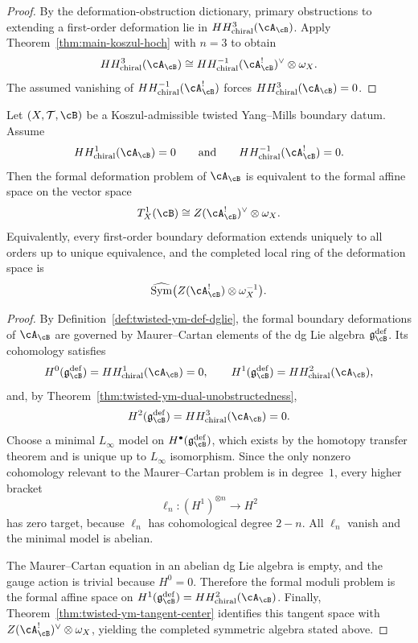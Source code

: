 \begin{proof}
By the deformation-obstruction dictionary, primary obstructions to extending a first-order deformation lie in $HH^{3}_{\mathrm{chiral}}(\cA_{\cB})$. Apply Theorem~\ref{thm:main-koszul-hoch} with $n=3$ to obtain
\[
HH^{3}_{\mathrm{chiral}}(\cA_{\cB})
\cong
HH^{-1}_{\mathrm{chiral}}(\cA_{\cB}^{!})^{\vee}\otimes \omega_X.
\]
The assumed vanishing of $HH^{-1}_{\mathrm{chiral}}(\cA_{\cB}^{!})$ forces $HH^{3}_{\mathrm{chiral}}(\cA_{\cB})=0$.
\end{proof}

\begin{theorem}
\label{thm:twisted-ym-central-formality}
Let $(X,\mathcal{T},\cB)$ be a Koszul-admissible twisted Yang--Mills boundary datum. Assume
\[
HH^{1}_{\mathrm{chiral}}(\cA_{\cB}) = 0
\qquad\text{and}\qquad
HH^{-1}_{\mathrm{chiral}}(\cA_{\cB}^{!}) = 0.
\]
Then the formal deformation problem of $\cA_{\cB}$ is equivalent to the formal affine space on the vector space
\[
T^1_X(\cB)
\cong
Z(\cA_{\cB}^{!})^{\vee}\otimes \omega_X.
\]
Equivalently, every first-order boundary deformation extends uniquely to all orders up to unique equivalence, and the completed local ring of the deformation space is
\[
\widehat{\mathrm{Sym}}\bigl(Z(\cA_{\cB}^{!})\otimes \omega_X^{-1}\bigr).
\]
\end{theorem}

\begin{proof}
By Definition~\ref{def:twisted-ym-def-dglie}, the formal boundary
deformations of $\cA_{\cB}$ are governed by Maurer--Cartan elements of
the dg Lie algebra $\mathfrak{g}^{\mathrm{def}}_{\cB}$. Its cohomology
satisfies
\[
H^0(\mathfrak{g}^{\mathrm{def}}_{\cB}) = HH^{1}_{\mathrm{chiral}}(\cA_{\cB}) = 0,
\qquad
H^1(\mathfrak{g}^{\mathrm{def}}_{\cB}) = HH^{2}_{\mathrm{chiral}}(\cA_{\cB}),
\]
and, by Theorem~\ref{thm:twisted-ym-dual-unobstructedness},
\[
H^2(\mathfrak{g}^{\mathrm{def}}_{\cB}) = HH^{3}_{\mathrm{chiral}}(\cA_{\cB}) = 0.
\]
Choose a minimal $L_\infty$ model on $H^\bullet(\mathfrak{g}^{\mathrm{def}}_{\cB})$, which exists by the homotopy transfer theorem and is unique up to $L_\infty$ isomorphism. Since the only nonzero cohomology relevant to the Maurer--Cartan problem is in degree~$1$, every higher bracket
\[
\ell_n \colon (H^1)^{\otimes n} \longrightarrow H^{2}
\]
has zero target, because $\ell_n$ has cohomological degree $2-n$. All $\ell_n$ vanish and the minimal model is abelian.

The Maurer--Cartan equation in an abelian dg Lie algebra is empty, and the gauge action is trivial because $H^0=0$. Therefore the formal moduli problem is the formal affine space on $H^1(\mathfrak{g}^{\mathrm{def}}_{\cB}) = HH^2_{\mathrm{chiral}}(\cA_{\cB})$. Finally, Theorem~\ref{thm:twisted-ym-tangent-center} identifies this tangent space with $Z(\cA_{\cB}^{!})^{\vee}\otimes\omega_X$, yielding the completed symmetric algebra stated above.
\end{proof}

